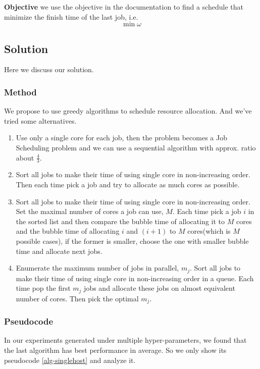 \documentclass{llncs}
\begin{document}
\textbf{Objective} we use the objective in the documentation to find a schedule that minimize the finish time of the last job, i.e.
\begin{equation}
    \min \omega
\end{equation}


\subsection*{Solution}
Here we discuss our solution.
\subsubsection*{Method}
We propose to use greedy algorithms to schedule resource allocation. And we've tried some alternatives.

\begin{enumerate}
    \item Use only a single core for each job, then the problem becomes a Job Scheduling problem and we can use a sequential algorithm with approx. ratio about $\frac{4}{3}$.
    
    \item Sort all jobs to make their time of using single core in non-increasing order. Then each time pick a job and try to allocate as much cores as possible.
    
    \item Sort all jobs to make their time of using single core in non-increasing order. Set the maximal number of cores a job can use, $M$.
    Each time pick a job $i$ in the sorted list and then compare the bubble time of allocating it to $M$ cores and the bubble time of allocating $i$ and $(i+1)$ to $M$ cores(which is $M$ possible cases), if the former is smaller, choose the one with smaller bubble time and allocate next jobs.
    
    \item Enumerate the maximum number of jobs in parallel, $m_j$. Sort all jobs to make their time of using single core in non-increasing order in a queue.
    Each time pop the first $m_j$ jobs and allocate these jobs on almost equivalent number of cores.
    Then pick the optimal $m_j$.
\end{enumerate}

\subsubsection*{Pseudocode}
In our experiments generated under multiple hyper-parameters, we found that the last algorithm has best performance in average. So we only show its pseudocode \ref{alg-singlehost} and analyze it.
\end{document}
